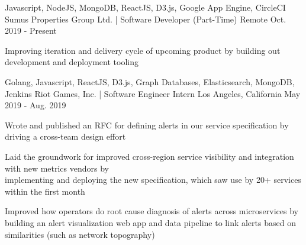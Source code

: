 

\begin{cventries}

  \cventry
    {Javascript, NodeJS, MongoDB, ReactJS, D3.js, Google App Engine, CircleCI} %
    {Sumus Properties Group Ltd. | Software Developer (Part-Time)} %
    {Remote} %
    {Oct. 2019 - Present} %
    {
      \begin{cvitems} %
        \item {Improving iteration and delivery cycle of upcoming product by building out development and deployment tooling}
      \end{cvitems}
    }

  \cventry
    {Golang, Javascript, ReactJS, D3.js, Graph Databases, Elasticsearch, MongoDB, Jenkins} %
    {Riot Games, Inc. | Software Engineer Intern} %
    {Los Angeles, California} %
    {May 2019 - Aug. 2019} %
    {
      \begin{cvitems} %
        \item {Wrote and published an RFC for defining alerts in our service specification by driving a cross-team design effort}
        \item{Laid the groundwork for improved cross-region service visibility and integration with new metrics vendors by \\implementing and deploying the new specification, which saw use by 20+ services within the first month}
        \item {Improved how operators do root cause diagnosis of alerts across microservices by building an alert visualization web app and data pipeline to link alerts based on similarities (such as network topography)}
      \end{cvitems}
    }


\end{cventries}
